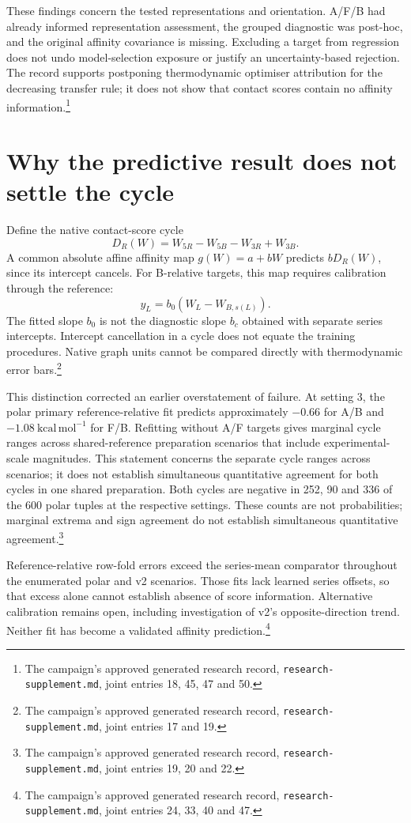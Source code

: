 \documentclass{article}
\newcommand{\rr}[1]{\footnote{The campaign's approved generated research record, \texttt{research-supplement.md}, #1.}}
\begin{document}
These findings concern the tested representations and orientation. A/F/B had already informed representation assessment, the grouped diagnostic was post-hoc, and the original affinity covariance is missing. Excluding a target from regression does not undo model-selection exposure or justify an uncertainty-based rejection. The record supports postponing thermodynamic optimiser attribution for the decreasing transfer rule; it does not show that contact scores contain no affinity information.\rr{joint entries 18, 45, 47 and 50}

\section{Why the predictive result does not settle the cycle}

Define the native contact-score cycle
\[
 D_R(W)=W_{5R}-W_{5B}-W_{3R}+W_{3B}.
\]
A common absolute affine affinity map \(g(W)=a+bW\) predicts \(bD_R(W)\), since its intercept cancels. For B-relative targets, this map requires calibration through the reference:
\[
 y_L=b_0(W_L-W_{B,s(L)}).
\]
The fitted slope \(b_0\) is not the diagnostic slope \(b_c\) obtained with separate series intercepts. Intercept cancellation in a cycle does not equate the training procedures. Native graph units cannot be compared directly with thermodynamic error bars.\rr{joint entries 17 and 19}

This distinction corrected an earlier overstatement of failure. At setting 3, the polar primary reference-relative fit predicts approximately \(-0.66\) for A/B and \(-1.08\ \mathrm{kcal\,mol^{-1}}\) for F/B. Refitting without A/F targets gives marginal cycle ranges across shared-reference preparation scenarios that include experimental-scale magnitudes. This statement concerns the separate cycle ranges across scenarios; it does not establish simultaneous quantitative agreement for both cycles in one shared preparation. Both cycles are negative in 252, 90 and 336 of the 600 polar tuples at the respective settings. These counts are not probabilities; marginal extrema and sign agreement do not establish simultaneous quantitative agreement.\rr{joint entries 19, 20 and 22}

Reference-relative row-fold errors exceed the series-mean comparator throughout the enumerated polar and v2 scenarios. Those fits lack learned series offsets, so that excess alone cannot establish absence of score information. Alternative calibration remains open, including investigation of v2's opposite-direction trend. Neither fit has become a validated affinity prediction.\rr{joint entries 24, 33, 40 and 47}
\end{document}
